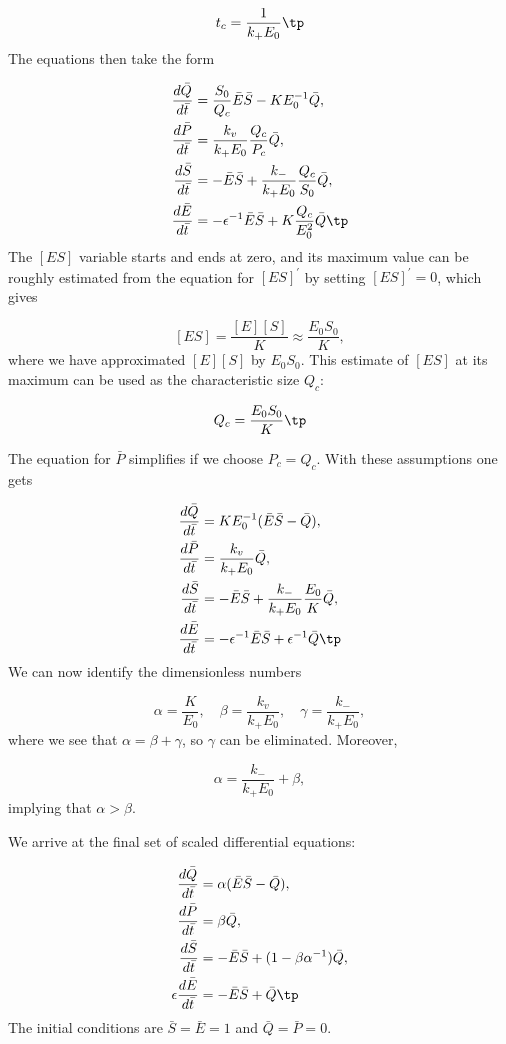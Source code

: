 \documentclass[graybox,envcountchap,sectrefs,final]{svmonodo}
\begin{document}
\[ t_c = \frac{1}{k_+E_0}\tp\]
The equations then take the form

\begin{align*}
\frac{d\bar Q}{d\bar t} &= \frac{S_0}{Q_c}\bar E\bar S
- KE_0^{-1}\bar Q,\\ 
\frac{d\bar P}{d\bar t} &= \frac{k_v}{k_+ E_0}\frac{Q_c}{P_c}\bar Q,\\ 
\frac{d\bar S}{d\bar t} &= -\bar E\bar S
+ \frac{k_-}{k_+E_0}\frac{Q_c}{S_0}\bar Q,\\ 
\frac{d\bar E}{d\bar t} &= -\epsilon^{-1}\bar E\bar S
+ K\frac{Q_c}{E_0^2}\bar Q\tp
\end{align*}
The $[ES]$ variable starts and ends at zero, and its maximum value
can be roughly estimated from the equation for $[ES]^\prime$
by setting $[ES]^\prime = 0$, which gives

\[ [ES] = \frac{[E][S]}{K}\approx \frac{E_0S_0}{K},\]
where we have approximated $[E][S]$ by $E_0S_0$. This estimate of $[ES]$
at its maximum can be used as the characteristic size $Q_c$:

\[ Q_c = \frac{E_0S_0}{K}\tp\]

The equation for $\bar P$ simplifies if we choose $P_c=Q_c$.
With these assumptions one gets

\begin{align*}
\frac{d\bar Q}{d\bar t} &= KE_0^{-1} (\bar E\bar S
- \bar Q),\\ 
\frac{d\bar P}{d\bar t} &= \frac{k_v}{k_+ E_0}\bar Q,\\ 
\frac{d\bar S}{d\bar t} &= -\bar E\bar S
+ \frac{k_-}{k_+E_0}\frac{E_0}{K}\bar Q,\\ 
\frac{d\bar E}{d\bar t} &= -\epsilon^{-1}\bar E\bar S
+ \epsilon^{-1}\bar Q\tp
\end{align*}
We can now identify the dimensionless numbers

\[ \alpha = \frac{K}{E_0},\quad \beta = \frac{k_v}{k_+ E_0},
\quad \gamma = \frac{k_-}{k_+E_0},
\]
where we see that $\alpha = \beta + \gamma$, so $\gamma$ can be eliminated.
Moreover,

\[ \alpha = \frac{k_-}{k_+E_0} + \beta,\]
implying that $\alpha > \beta$.

We arrive at the final set of scaled differential equations:

\begin{align}
\frac{d\bar Q}{d\bar t} &= \alpha (\bar E\bar S
- \bar Q),
\label{scale:MMK:Q2}\\ 
\frac{d\bar P}{d\bar t} &= \beta\bar Q,
\label{scale:MMK:P2}\\ 
\frac{d\bar S}{d\bar t} &= -\bar E\bar S
+ (1 - \beta\alpha^{-1})\bar Q,
\label{scale:MMK:S2}\\ 
\epsilon\frac{d\bar E}{d\bar t} &= -\bar E\bar S + \bar Q\tp
\label{scale:MMK:E2}
\end{align}
The initial conditions are $\bar S=\bar E =1$ and $\bar Q=\bar P=0$.
\end{document}

